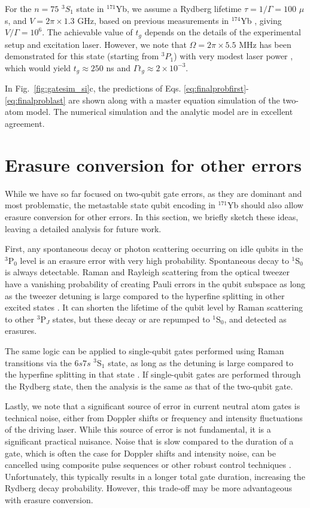 \documentclass[%
reprint,
superscriptaddress,
 amsmath,amssymb,
 aps,
 prx,
floatfix,
]{revtex4-1}
\begin{document}
For the $n=75$ $^3S_1$ state in $^{171}$Yb, we assume a Rydberg lifetime $\tau = 1/\Gamma = 100$ $\mu$s, and $V=2\pi \times 1.3$ GHz, based on previous measurements in $^{174}$Yb \cite{Wilson2019,burgers2021}, giving $V/\Gamma = 10^6$. The achievable value of $t_g$ depends on the details of the experimental setup and excitation laser. However, we note that $\Omega = 2\pi \times 5.5$ MHz has been demonstrated for this state (starting from $^3P_1$) with very modest laser power \cite{burgers2021}, which would yield $t_g \approx 250$ ns and $\Gamma t_g \approx 2 \times 10^{-3}$.

In Fig.~\ref{fig:gatesim_si}c, the predictions of Eqs. \eqref{eq:finalprobfirst}-\eqref{eq:finalproblast} are shown along with a master equation simulation of the two-atom model. The numerical simulation and the analytic model are in excellent agreement.

\section{Erasure conversion for other errors}
\label{app:othererrors}

While we have so far focused on two-qubit gate errors, as they are dominant and most problematic, the metastable state qubit encoding in $^{171}$Yb should also allow erasure conversion for other errors. In this section, we briefly sketch these ideas, leaving a detailed analysis for future work.

First, any spontaneous decay or photon scattering occurring on idle qubits in the ${}^{3}$P$_{0}$ level is an erasure error with very high probability. Spontaneous decay to $^1$S$_0$ is always detectable. Raman and Rayleigh scattering from the optical tweezer have a vanishing probability of creating Pauli errors in the qubit subspace as long as the tweezer detuning is large compared to the hyperfine splitting in other excited states \cite{dorscher2018}. It can shorten the lifetime of the qubit level by Raman scattering to other $^3$P$_J$ states, but these decay or are repumped to $^1$S$_0$, and detected as erasures.

The same logic can be applied to single-qubit gates performed using Raman transitions via the $6s7s$ $^3$S$_1$ state, as long as the detuning is large compared to the hyperfine splitting in that state \cite{Ozeri2007}. If single-qubit gates are performed through the Rydberg state, then the analysis is the same as that of the two-qubit gate.

Lastly, we note that a significant source of error in current neutral atom gates is technical noise, either from Doppler shifts or frequency and intensity fluctuations of the driving laser. While this source of error is not fundamental, it is a significant practical nuisance. Noise that is slow compared to the duration of a gate, which is often the case for Doppler shifts and intensity noise, can be cancelled using composite pulse sequences \cite{wolfowicz2016} or other robust control techniques \cite{wenzheng2021}. Unfortunately, this typically results in a longer total gate duration, increasing the Rydberg decay probability. However, this trade-off may be more advantageous with erasure conversion.
\end{document}

